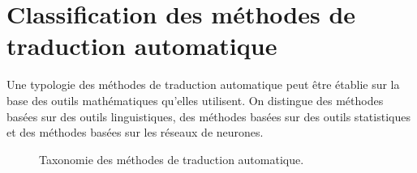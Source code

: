 \section{Classification des méthodes de traduction automatique}

Une typologie des méthodes de traduction automatique peut être établie sur la base des outils mathématiques qu'elles utilisent. 
On distingue des méthodes basées sur des outils linguistiques, 
des méthodes basées sur des outils statistiques et des méthodes basées sur les réseaux de neurones.

\begin{figure}
    \begin{center}
       \resizebox{\textwidth}{!}{
         
       }
    \end{center}
    \caption{Taxonomie des méthodes de traduction automatique.}
\end{figure}

